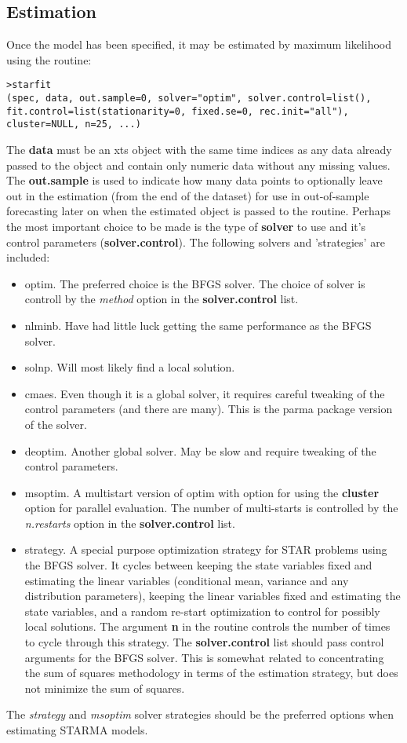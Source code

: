 \subsection{Estimation}
Once the model has been specified, it may be estimated by maximum likelihood
using the  routine:
\begin{lstlisting}
>starfit
(spec, data, out.sample=0, solver="optim", solver.control=list(), 
fit.control=list(stationarity=0, fixed.se=0, rec.init="all"), 
cluster=NULL, n=25, ...)
\end{lstlisting}
The \textbf{data} must be an xts object with the same time indices as any data
already passed to the  object and contain only numeric data
without any missing values. The \textbf{out.sample} is used to indicate how many
data points to optionally leave out in the estimation (from the end of the
dataset) for use in out-of-sample forecasting later on when the estimated object
is passed to the  routine. Perhaps the most important choice
to be made is the type of \textbf{solver} to use and it's control parameters
(\textbf{solver.control}). The following solvers and 'strategies' are included:
\begin{itemize}
  \item optim. The preferred choice is the BFGS solver. The choice of solver is
  controll by the \emph{method} option in the \textbf{solver.control} list.
  \item nlminb. Have had little luck getting the same performance as the BFGS
  solver.
  \item solnp. Will most likely find a local solution.
  \item cmaes. Even though it is a global solver, it requires careful tweaking
  of the control parameters (and there are many). This is the parma package
  version of the solver.
  \item deoptim. Another global solver. May be slow and require tweaking of the
  control parameters.
  \item msoptim. A multistart version of optim with option for using the
  \textbf{cluster} option for parallel evaluation. The number of
  multi-starts is controlled by the \emph{n.restarts} option in the
  \textbf{solver.control} list.
  \item strategy. A special purpose optimization strategy for STAR problems
  using the BFGS solver. It cycles between keeping the state variables fixed and
  estimating the linear variables (conditional mean, variance and any
  distribution parameters), keeping the linear variables fixed and estimating
  the state variables, and a random re-start optimization to control for
  possibly local solutions. The argument \textbf{n} in the routine controls the
  number of times to cycle through this strategy. The \textbf{solver.control}
  list should pass control arguments for the BFGS solver. This is somewhat
  related to concentrating the sum of squares methodology in terms of the
  estimation strategy, but does not minimize the sum of squares.
\end{itemize}
The \emph{strategy} and \emph{msoptim} solver strategies should be the preferred
options when estimating STARMA models.

